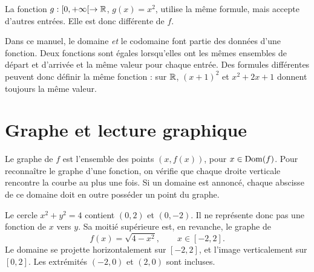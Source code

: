La fonction \(g:[0,+\infty[\to\mathbb{R}\), \(g(x)=x^2\), utilise la même formule, mais accepte d'autres entrées. Elle est donc différente de \(f\).

\begin{connectionbox}[title={Convention d'égalité des fonctions}]
Dans ce manuel, le domaine \emph{et} le codomaine font partie des données d'une fonction. Deux fonctions sont égales lorsqu'elles ont les mêmes ensembles de départ et d'arrivée et la même valeur pour chaque entrée. Des formules différentes peuvent donc définir la même fonction : sur \(\mathbb{R}\), \((x+1)^2\) et \(x^2+2x+1\) donnent toujours la même valeur.
\end{connectionbox}

\section{Graphe et lecture graphique}
\label{manual:section:03.02}

Le graphe de \(f\) est l'ensemble des points \((x,f(x))\), pour \(x\in\operatorname{Dom}(f)\). Pour reconnaître le graphe d'une fonction, on vérifie que chaque droite verticale rencontre la courbe au plus une fois. Si un domaine est annoncé, chaque abscisse de ce domaine doit en outre posséder un point du graphe.

\begin{examplebox}[title={Un cercle et sa moitié supérieure}]
Le cercle \(x^2+y^2=4\) contient \((0,2)\) et \((0,-2)\). Il ne représente donc pas une fonction de \(x\) vers \(y\). Sa moitié supérieure est, en revanche, le graphe de
\[
f(x)=\sqrt{4-x^2},\qquad x\in[-2,2].
\]
Le domaine se projette horizontalement sur \([-2,2]\), et l'image verticalement sur \([0,2]\). Les extrémités \((-2,0)\) et \((2,0)\) sont incluses.
\end{examplebox}

\begin{center}
\end{center}

